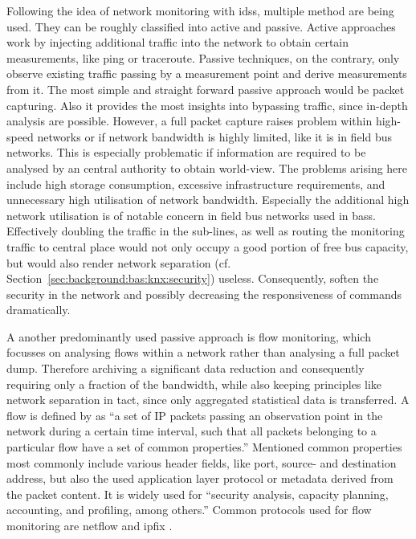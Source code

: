 Following the idea of network monitoring with \glspl{ids}, multiple method are being used. They can be roughly classified into active and passive. 
Active approaches work by injecting additional traffic into the network to obtain certain measurements, like ping or traceroute.
Passive techniques, on the contrary, only observe existing traffic passing by a measurement point and derive measurements from it. The most simple and straight forward passive approach would be packet capturing. Also it provides the most insights into bypassing traffic, since in-depth analysis are possible. However, a full packet capture raises problem within high-speed networks or if network bandwidth is highly limited, like it is in field bus networks. This is especially problematic if information are required to be analysed by an central authority to obtain world-view. The problems arising here include high storage consumption, excessive infrastructure requirements, and unnecessary high utilisation of network bandwidth. 
\parencite[cf.][]{Hofstede2014}
Especially the additional high network utilisation is of notable concern in field bus networks used in \glspl{bas}. Effectively doubling the traffic in the sub-lines, as well as routing the monitoring traffic to central place would not only occupy a good portion of free bus capacity, but would also render network separation (cf. Section~\ref{sec:background:bas:knx:security}) useless. Consequently, soften the security in the network and possibly decreasing the responsiveness of commands dramatically.

A another predominantly used passive approach is flow monitoring, which focusses on analysing flows within a network rather than analysing a full packet dump. Therefore archiving a significant data reduction and consequently requiring only a fraction of the bandwidth, while also keeping principles like network separation in tact, since only aggregated statistical data is transferred.
A flow is defined by \textcite{Claise2013} as \enquote{a set of IP packets passing an observation point in the network during a certain time interval, such that all packets belonging to a particular flow have a set of common properties.}
Mentioned common properties most commonly include various header fields, like port, source- and destination address, but also the used application layer protocol or metadata derived from the packet content.
It is widely used for \enquote{security analysis, capacity planning, accounting, and profiling, among others.} \parencite{Hofstede2014}
Common protocols used for flow monitoring are \gls{netflow} \parencite{Claise2004} and \gls{ipfix} \parencite{Claise2013}.

